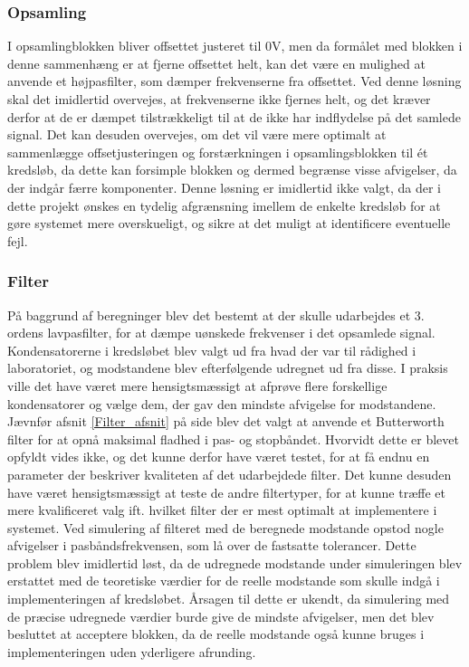 \subsubsection{Opsamling}
I opsamlingblokken bliver offsettet justeret til $0$V, men da formålet med blokken i denne sammenhæng er at fjerne offsettet helt, kan det være en mulighed at anvende et højpasfilter, som dæmper frekvenserne fra offsettet. Ved denne løsning skal det imidlertid overvejes, at frekvenserne ikke fjernes helt, og det kræver derfor at de er dæmpet tilstrækkeligt til at de ikke har indflydelse på det samlede signal. Det kan desuden overvejes, om det vil være mere optimalt at sammenlægge offsetjusteringen og forstærkningen i opsamlingsblokken til ét kredsløb, da dette kan forsimple blokken og dermed begrænse visse afvigelser, da der indgår færre komponenter. Denne løsning er imidlertid ikke valgt, da der i dette projekt ønskes en tydelig afgrænsning imellem de enkelte kredsløb for at gøre systemet mere overskueligt, og sikre at det muligt at identificere eventuelle fejl. 

\subsubsection{Filter}
På baggrund af beregninger blev det bestemt at der skulle udarbejdes et 3. ordens lavpasfilter, for at dæmpe uønskede frekvenser i det opsamlede signal. Kondensatorerne i kredsløbet blev valgt ud fra hvad der var til rådighed i laboratoriet, og modstandene blev efterfølgende udregnet ud fra disse. I praksis ville det have været mere hensigtsmæssigt at afprøve flere forskellige kondensatorer og vælge dem, der gav den mindste afvigelse for modstandene.
Jævnfør afsnit \ref{Filter_afsnit} på side \pageref{Filter_afsnit} blev det valgt at anvende et Butterworth filter for at opnå maksimal fladhed i pas- og stopbåndet. Hvorvidt dette er blevet opfyldt vides ikke, og det kunne derfor have været testet, for at få endnu en parameter der beskriver kvaliteten af det udarbejdede filter. Det kunne desuden have været hensigtsmæssigt at teste de andre filtertyper, for at kunne træffe et mere kvalificeret valg ift. hvilket filter der er mest optimalt at implementere i systemet.   
Ved simulering af filteret med de beregnede modstande opstod nogle afvigelser i pasbåndsfrekvensen, som lå over de fastsatte tolerancer. Dette problem blev imidlertid løst, da de udregnede modstande under simuleringen blev erstattet med de teoretiske værdier for de reelle modstande som skulle indgå i implementeringen af kredsløbet. Årsagen til dette er ukendt, da simulering med de præcise udregnede værdier burde give de mindste afvigelser, men det blev besluttet at acceptere blokken, da de reelle modstande også kunne bruges i implementeringen uden yderligere afrunding.

